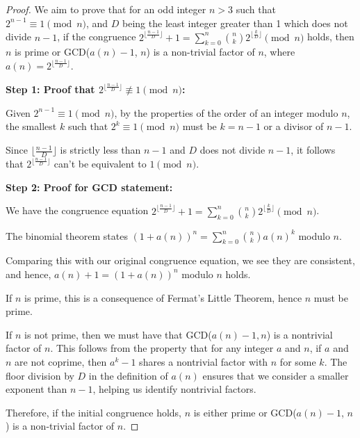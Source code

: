 \begin{proof}
We aim to prove that for an odd integer $n > 3$ such that $2^{n-1} \equiv 1 \pmod{n}$, and $D$ being the least integer greater than 1 which does not divide $n-1$, if the congruence $2^{\lfloor\frac{n-1}{D}\rfloor} + 1 = \sum_{k=0}^{n}\binom{n}{k}2^{\lfloor\frac{k}{D}\rfloor} \pmod{n}$ holds, then $n$ is prime or GCD($a(n) - 1$, $n$) is a non-trivial factor of $n$, where $a(n) = 2^{\lfloor\frac{n-1}{D}\rfloor}$.

\textbf{Step 1: Proof that $2^{\lfloor\frac{n-1}{D}\rfloor} \not\equiv 1 \pmod{n}$:}

Given $2^{n-1} \equiv 1 \pmod{n}$, by the properties of the order of an integer modulo $n$, the smallest $k$ such that $2^k \equiv 1 \pmod{n}$ must be $k = n-1$ or a divisor of $n-1$.

Since $\lfloor\frac{n-1}{D}\rfloor$ is strictly less than $n-1$ and $D$ does not divide $n-1$, it follows that $2^{\lfloor\frac{n-1}{D}\rfloor}$ can't be equivalent to $1 \pmod{n}$.

\textbf{Step 2: Proof for GCD statement:}

We have the congruence equation $2^{\lfloor\frac{n-1}{D}\rfloor} + 1 = \sum_{k=0}^{n}\binom{n}{k}2^{\lfloor\frac{k}{D}\rfloor} \pmod{n}$.

The binomial theorem states $(1 + a(n))^n = \sum_{k=0}^{n} \binom{n}{k} a(n)^{k}$ modulo $n$.

Comparing this with our original congruence equation, we see they are consistent, and hence, $a(n) + 1 = (1 + a(n))^n$ modulo $n$ holds.

If $n$ is prime, this is a consequence of Fermat's Little Theorem, hence $n$ must be prime.

If $n$ is not prime, then we must have that GCD($a(n) - 1, n$) is a nontrivial factor of $n$. This follows from the property that for any integer $a$ and $n$, if $a$ and $n$ are not coprime, then $a^k - 1$ shares a nontrivial factor with $n$ for some $k$. The floor division by $D$ in the definition of $a(n)$ ensures that we consider a smaller exponent than $n-1$, helping us identify nontrivial factors.

Therefore, if the initial congruence holds, $n$ is either prime or GCD($a(n) - 1$, $n$) is a non-trivial factor of $n$.
\end{proof}